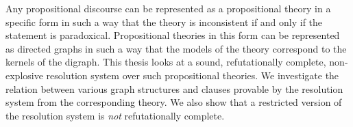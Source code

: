 Any propositional discourse can be represented as a propositional theory in a specific form in such a way that the theory is inconsistent if and only if the statement is paradoxical.
Propositional theories in this form can be represented as directed graphs in such a way that the models of the theory correspond to the kernels of the digraph.
This thesis looks at a sound, refutationally complete, non-explosive resolution system over such propositional theories.
We investigate the relation between various graph structures and clauses provable by the resolution system from the corresponding theory.
We also show that a restricted version of the resolution system is \textit{not} refutationally complete.
